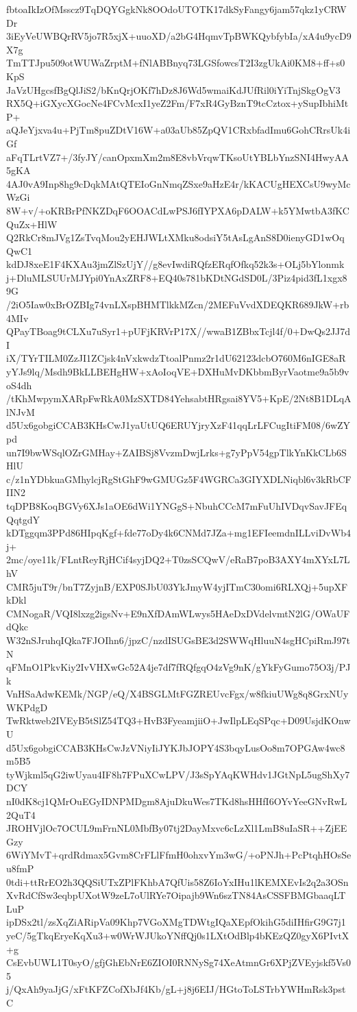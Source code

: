 fbtoaIkIzOfMsscz9TqDQYGgkNk8OOdoUTOTK17dkSyFangy6jam57qkz1yCRWDr
3iEyVeUWBQrRV5jo7R5xjX+uuoXD/a2bG4HqmvTpBWKQybfybIa/xA4u9ycD9X7g
TmTTJpu509otWUWaZrptM+fNlABBnyq73LGSfowcsT2I3zgUkAi0KM8+ff+s0KpS
JaVzUHgcsfBgQlJiS2/bKnQrjOKf7hDz8J6Wd5wmaiKdJUfRil0iYiTnjSkgOgV3
RX5Q+iGXycXGocNe4FCvMcxI1yeZ2Fm/F7xR4GyBznT9tcCztox+ySupIbhiMtP+
aQJeYjxva4u+PjTm8puZDtV16W+a03aUb85ZpQV1CRxbfadImu6GohCRrsUk4iGf
aFqTLrtVZ7+/3fyJY/canOpxmXm2m8E8vbVrqwTKsoUtYBLbYnzSNI4HwyAA5gKA
4AJ0vA9Inp8hg9cDqkMAtQTEIoGnNmqZSxe9aHzE4r/kKACUgHEXCsU9wyMcWzGi
8W+v/+oKRBrPfNKZDqF6OOACdLwPSJ6fIYPXA6pDALW+k5YMwtbA3fKCQuZx+HlW
Q2RkCr8mJVg1ZsTvqMou2yEHJWLtXMku8odsiY5tAsLgAnS8D0ienyGD1wOqQwC1
kdDJ8xeE1F4KXAu3jmZlSzUjY//g8evIwdiRQfzERqfOfkq52k3s+OLj5bYlonmk
j+DluMLSUUrMJYpi0YnAxZRF8+EQ40s781bKDtNGdSD0L/3Piz4pid3fL1xgx89G
/2iO5Iaw0xBrOZBIg74vnLXspBHMTlkkMZcn/2MEFuVvdXDEQKR689JkW+rb4MIv
QPayTBoag9tCLXu7uSyr1+pUFjKRVrP17X//wwaB1ZBbxTcjl4f/0+DwQs2JJ7dI
iX/TYrTILM0ZzJI1ZCjsk4nVxkwdzTtoalPnmz2r1dU62123dcbO760M6nIGE8aR
yYJs9lq/Msdh9BkLLBEHgHW+xAoIoqVE+DXHuMvDKbbmByrVaotme9a5b9voS4dh
/tKhMwpymXARpFwRkA0MzSXTD84YehsabtHRgsai8YV5+KpE/2Nt8B1DLqAlNJvM
d5Ux6gobgiCCAB3KHsCwJ1yaUtUQ6ERUYjryXzF41qqLrLFCugItiFM08/6wZYpd
un7I9bwWSqlOZrGMHay+ZAIBSj8VvzmDwjLrks+g7yPpV54gpTlkYnKkCLb6SHlU
c/z1nYDbkuaGMhylcjRgStGhF9wGMUGz5F4WGRCa3GIYXDLNiqbl6v3kRbCFIIN2
tqDPB8KoqBGVy6XJs1aOE6dWi1YNGgS+NbuhCCcM7mFuUhIVDqvSavJFEqQqtgdY
kDTggqm3PPd86HIpqKgf+fde77oDy4k6CNMd7JZa+mg1EFIeemdnILLviDvWb4j+
2mc/oye11k/FLntReyRjHCif4syjDQ2+T0zsSCQwV/eRaB7poB3AXY4mXYxL7LhV
CMR5juT9r/bnT7ZyjnB/EXP0SJbU03YkJmyW4yjITmC30omi6RLXQj+5upXFkDkl
CMNogaR/VQI8lxzg2igsNv+E9nXfDAmWLwys5HAeDxDVdelvmtN2lG/OWaUFdQkc
W32nSJruhqIQka7FJOIhn6/jpzC/nzdISUGsBE3d2SWWqHluuN4sgHCpiRmJ97tN
qFMnO1PkvKiy2IvVHXwGc52A4je7df7fRQfgqO4zVg9nK/gYkFyGumo75O3j/PJk
VnHSaAdwKEMk/NGP/eQ/X4BSGLMtFGZREUvcFgx/w8fkiuUWg8q8GrxNUyWKPdgD
TwRktweb2IVEyB5tSlZ54TQ3+HvB3FyeamjiiO+JwIlpLEqSPqc+D09UsjdKOnwU
d5Ux6gobgiCCAB3KHsCwJzVNiyIiJYKJbJOPY4S3bqyLusOo8m7OPGAw4wc8m5B5
tyWjkml5qG2iwUyau4IF8h7FPuXCwLPV/J3sSpYAqKWHdv1JGtNpL5ugShXy7DCY
nI0dK8cj1QMrOuEGyIDNPMDgm8AjuDkuWes7TKd8hsHHfI6OYvYeeGNvRwL2QuT4
JROHVjlOc7OCUL9mFrnNL0MbfBy07tj2DayMxvc6cLzXl1LmB8uIaSR++ZjEEGzy
6WiYMvT+qrdRdmax5Gvm8CrFLlFfmH0ohxvYm3wG/+oPNJh+PcPtqhHOsSeu8fmP
0tdi+ttRrEO2h3QQSiUTxZPlFKhbA7QfUis58Z6IoYxIHu1lKEMXEvIs2q2a3OSn
XvRdCfSw3eqbpUXotW9zeL7oUlRYe7Oipajb9Wn6szTN84AsCSSFBMGbaaqLTLuP
ipDSx2tl/zsXqZiARipVa09Khp7VGoXMgTDWtgIQaXEpfOkihG5diIHfirG9G7j1
yeC/5gTkqEryeKqXu3+w0WrWJUkoYNffQj0s1LXtOdBlp4bKEzQZ0gyX6PIvtX+g
CsEvbUWL1T0syO/gfjGhEbNrE6ZIOI0RNNySg74XeAtmnGr6XPjZVEyjskf5Vs05
j/QxAh9yaJjG/xFtKFZCofXbJf4Kb/gL+j8j6EIJ/HGtoToLSTrbYWHmRsk3pstC
